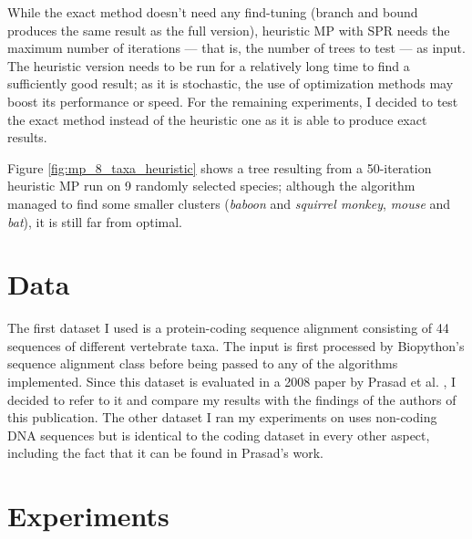 \documentclass[11pt,twocolumn]{article}
\begin{document}
While the exact method doesn't need any find-tuning (branch and bound produces the same result as the full version), heuristic MP with SPR needs the maximum number of iterations — that is, the number of trees to test — as input. The heuristic version needs to be run for a relatively long time to find a sufficiently good result; as it is stochastic, the use of optimization methods may boost its performance or speed. For the remaining experiments, I decided to test the exact method instead of the heuristic one as it is able to produce exact results.

Figure \ref{fig:mp_8_taxa_heuristic} shows a tree resulting from a 50-iteration heuristic MP run on 9 randomly selected species; although the algorithm managed to find some smaller clusters (\textit{baboon} and \textit{squirrel monkey}, \textit{mouse} and \textit{bat}), it is still far from optimal.


\section{Data}

The first dataset I used is a protein-coding sequence alignment \cite{dataset} consisting of 44 sequences of different vertebrate taxa. The input is first processed by Biopython's sequence alignment class before being passed to any of the algorithms implemented. Since this dataset is evaluated in a 2008 paper by Prasad et al. \cite{Prasad2008}, I decided to refer to it and compare my results with the findings of the authors of this publication. The other dataset I ran my experiments on uses non-coding DNA sequences but is identical to the coding dataset in every other aspect, including the fact that it can be found in Prasad's work.

\section{Experiments}


\end{document}
